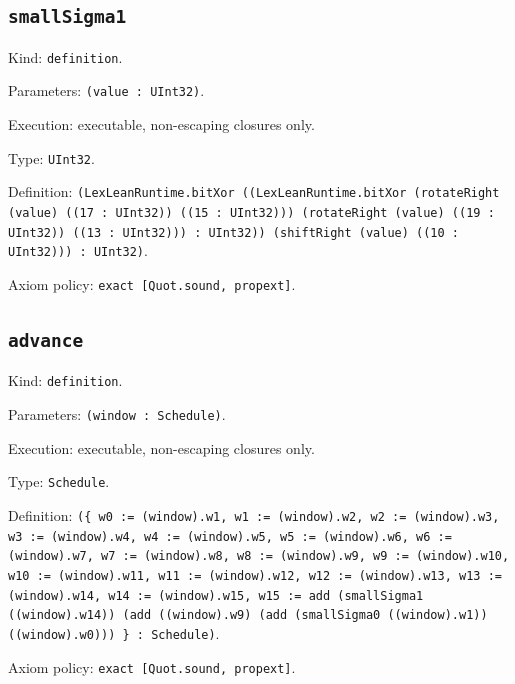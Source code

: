 \documentclass[11pt]{article}
\begin{document}
\subsection*{\texttt{smallSigma1}}
\noindent Kind: \texttt{definition}.\par
\noindent Parameters: \texttt{(value : UInt32)}.\par
\noindent Execution: executable, non-escaping closures only.\par
\noindent Type: \texttt{UInt32}.\par
\noindent Definition: \texttt{(LexLeanRuntime.bitXor ((LexLeanRuntime.bitXor (rotateRight (value) ((17 : UInt32)) ((15 : UInt32))) (rotateRight (value) ((19 : UInt32)) ((13 : UInt32))) : UInt32)) (shiftRight (value) ((10 : UInt32))) : UInt32)}.\par
\noindent Axiom policy: \texttt{exact [Quot.sound, propext]}.\par
\subsection*{\texttt{advance}}
\noindent Kind: \texttt{definition}.\par
\noindent Parameters: \texttt{(window : Schedule)}.\par
\noindent Execution: executable, non-escaping closures only.\par
\noindent Type: \texttt{Schedule}.\par
\noindent Definition: \texttt{(\{ w0 := (window).w1, w1 := (window).w2, w2 := (window).w3, w3 := (window).w4, w4 := (window).w5, w5 := (window).w6, w6 := (window).w7, w7 := (window).w8, w8 := (window).w9, w9 := (window).w10, w10 := (window).w11, w11 := (window).w12, w12 := (window).w13, w13 := (window).w14, w14 := (window).w15, w15 := add (smallSigma1 ((window).w14)) (add ((window).w9) (add (smallSigma0 ((window).w1)) ((window).w0))) \} : Schedule)}.\par
\noindent Axiom policy: \texttt{exact [Quot.sound, propext]}.\par
\end{document}

